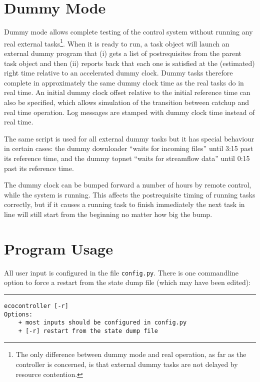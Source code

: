 \documentclass[11pt,a4paper]{report}
\begin{document}
\chapter{Dummy Mode}

Dummy mode allows complete testing of the control system without running
any real external tasks\footnote{The only difference between dummy mode
and real operation, as far as the controller is concerned, is that
external dummy tasks are not delayed by resource contention.}. When it
is ready to run, a task object will launch an external dummy program
that (i) gets a list of postrequisites from the parent task object and
then (ii) reports back that each one is satisfied at the (estimated)
right time relative to an accelerated dummy clock. Dummy tasks therefore
complete in approximately the same dummy clock time as the real tasks do
in real time. An initial dummy clock offset relative to the initial
reference time can also be specified, which allows simulation of the
transition between catchup and real time operation. Log messages are
stamped with dummy clock time instead of real time.

The same script is used for all external dummy tasks but it has special
behaviour in certain cases: the dummy downloader ``waits for incoming
files'' until 3:15 past its reference time, and the dummy topnet ``waits
for streamflow data'' until 0:15 past its reference time.

The dummy clock can be bumped forward a number of hours by remote
control, while the system is running. This affects the postrequisite
timing of running tasks correctly, but if it causes a running task to
finish immediately the next task in line will still start from the
beginning no matter how big the bump.


\chapter{Program Usage}

All user input is configured in the file \verb#config.py#. There is one
commandline option to force a restart from the state dump file (which
may have been edited):

\lstset{language=sh}

\noindent
\rule{5cm}{.2mm}
\begin{lstlisting}
ecocontroller [-r]
Options:
    + most inputs should be configured in config.py
    + [-r] restart from the state dump file
\end{lstlisting}
\end{document}
